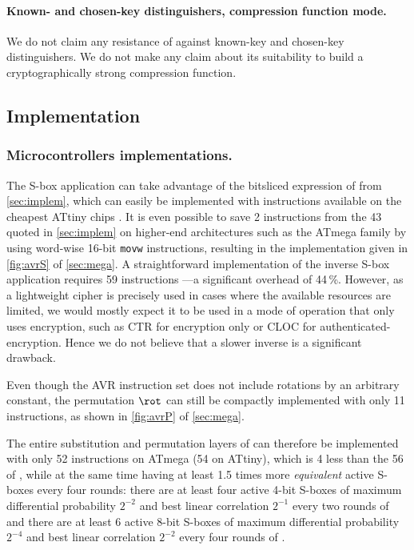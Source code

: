 \paragraph{Known- and chosen-key distinguishers, compression function mode.}
We do not claim any resistance of \fly against known-key and chosen-key distinguishers. We do not make any claim about its suitability
to build a cryptographically strong compression function.

\subsection{Implementation}
\label{sec:flyimplem}


\subsubsection{Microcontrollers implementations.}
The S-box application can take advantage of the bitsliced expression of \littlunOne from \autoref{sec:implem}, which can easily be implemented with instructions available on the cheapest ATtiny chips \cite{ATtiny}. It is even possible to save 2 instructions from
the 43 quoted in \autoref{sec:implem} on higher-end architectures such as the ATmega family \cite{ATmega} by using word-wise 16-bit \texttt{movw} instructions,
resulting in the implementation given in \autoref{fig:avrS} of \autoref{sec:mega}. A straightforward implementation of the inverse S-box application requires 59 instructions ---a significant overhead of 44\,\%.
However, as a lightweight cipher is precisely used in cases where the available resources are limited, we would mostly expect it to be used in a mode of operation that only uses encryption,
such as \eg \textsf{CTR} for encryption only or \textsf{CLOC} \cite{cloc} for authenticated-encryption. Hence we do not believe that a slower inverse is a significant drawback.

Even though the AVR instruction set does not include rotations by an arbitrary constant, the permutation $\rot$ can still
be compactly implemented with only 11 instructions, as shown in \autoref{fig:avrP} of \autoref{sec:mega}.

The entire substitution and permutation layers of \fly can therefore be implemented with only 52 instructions on ATmega (54 on ATtiny), which is 4 less than the 56 of \pride \cite{pride},
while at the same time having at least 1.5 times more \emph{equivalent} active S-boxes every four rounds: there are at least four active 4-bit S-boxes of maximum differential probability $2^{-2}$ and
best linear correlation $2^{-1}$ every two rounds of \pride and there are at least 6 active 8-bit S-boxes of maximum differential probability $2^{-4}$ and best linear correlation $2^{-2}$ every
four rounds of \fly.

